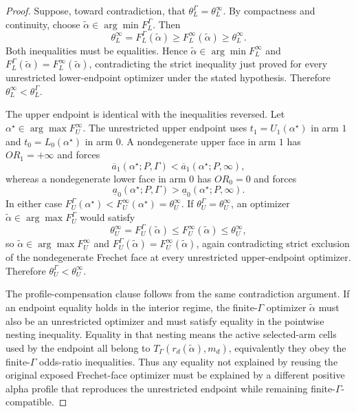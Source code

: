 \documentclass[11pt]{article}
\theoremstyle{definition}
\theoremstyle{plain}
\theoremstyle{remark}
\begin{document}
\begin{proof}
Suppose, toward contradiction, that \(\theta_L^\Gamma=\theta_L^\infty\).  By
compactness and continuity, choose \(\tilde\alpha\in\arg\min F_L^\Gamma\).
Then
\[
  \theta_L^\infty
  =
  F_L^\Gamma(\tilde\alpha)
  \ge
  F_L^\infty(\tilde\alpha)
  \ge
  \theta_L^\infty.
\]
Both inequalities must be equalities.  Hence
\(\tilde\alpha\in\arg\min F_L^\infty\) and
\(F_L^\Gamma(\tilde\alpha)=F_L^\infty(\tilde\alpha)\), contradicting the
strict inequality just proved for every unrestricted lower-endpoint optimizer
under the stated hypothesis.  Therefore \(\theta_L^\infty<\theta_L^\Gamma\).

The upper endpoint is identical with the inequalities reversed.  Let
\(\alpha^\star\in\arg\max F_U^\infty\).  The unrestricted upper endpoint uses
\(t_1=U_1(\alpha^\star)\) in arm \(1\) and \(t_0=L_0(\alpha^\star)\) in arm
\(0\).  A nondegenerate upper face in arm \(1\) has \(OR_1=+\infty\) and forces
\[
  \overline a_1(\alpha^\star;P,\Gamma)
  <
  \overline a_1(\alpha^\star;P,\infty),
\]
whereas a nondegenerate lower face in arm \(0\) has \(OR_0=0\) and forces
\[
  \underline a_0(\alpha^\star;P,\Gamma)
  >
  \underline a_0(\alpha^\star;P,\infty).
\]
In either case \(F_U^\Gamma(\alpha^\star)<F_U^\infty(\alpha^\star)=\theta_U^\infty\).
If \(\theta_U^\Gamma=\theta_U^\infty\), an optimizer
\(\tilde\alpha\in\arg\max F_U^\Gamma\) would satisfy
\[
  \theta_U^\infty
  =
  F_U^\Gamma(\tilde\alpha)
  \le
  F_U^\infty(\tilde\alpha)
  \le
  \theta_U^\infty,
\]
so \(\tilde\alpha\in\arg\max F_U^\infty\) and
\(F_U^\Gamma(\tilde\alpha)=F_U^\infty(\tilde\alpha)\), again contradicting
strict exclusion of the nondegenerate Frechet face at every unrestricted
upper-endpoint optimizer.  Therefore \(\theta_U^\Gamma<\theta_U^\infty\).

The profile-compensation clause follows from the same contradiction argument.
If an endpoint equality holds in the interior regime, the finite-\(\Gamma\)
optimizer \(\tilde\alpha\) must also be an unrestricted optimizer and must
satisfy equality in the pointwise nesting inequality.  Equality in that nesting
means the active selected-arm cells used by the endpoint all belong to
\(T_\Gamma(r_d(\tilde\alpha),m_d)\), equivalently they obey the
finite-\(\Gamma\) odds-ratio inequalities.  Thus any equality not explained by
reusing the original exposed Frechet-face optimizer must be explained by a
different positive alpha profile that reproduces the unrestricted endpoint
while remaining finite-\(\Gamma\)-compatible.
\end{proof}
\end{document}
